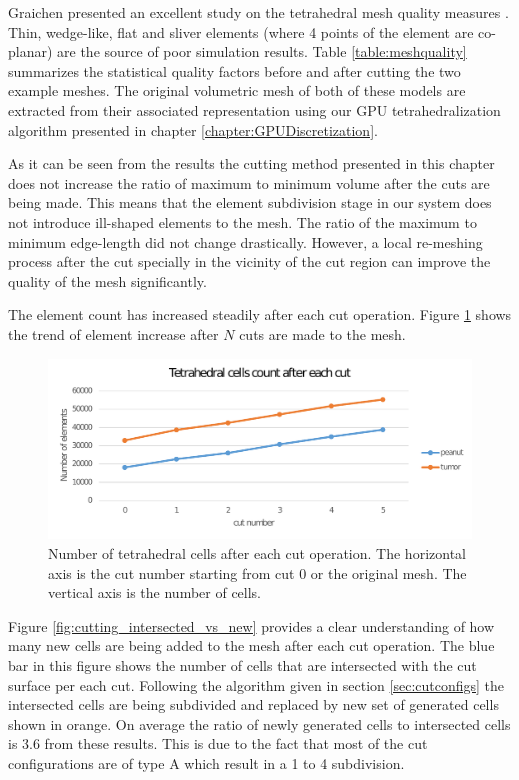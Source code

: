 Graichen \etal presented an excellent study on the tetrahedral mesh quality measures \cite{Graichen1993}. 
Thin, wedge-like, flat and sliver elements (where 4 points of the element are co-planar) are the source of poor simulation 
results. Table \ref{table:meshquality} summarizes the statistical quality factors before and after cutting the two example meshes. 
The original volumetric mesh of both of these models are extracted from their associated \blob representation using our GPU tetrahedralization
algorithm presented in chapter \ref{chapter:GPUDiscretization}.

As it can be seen from the results the cutting method presented in this chapter does not increase the ratio of maximum to minimum 
volume after the cuts are being made. This means that the element subdivision stage in our system does not 
introduce ill-shaped elements to the mesh. The ratio of the maximum to minimum edge-length did not change drastically.
However, a local re-meshing process after the cut specially in the vicinity of the cut region can improve the quality 
of the mesh significantly. 

The element count has increased steadily after each cut operation. Figure \ref{fig:cutting_cells_increase} shows the trend of element increase 
after $N$ cuts are made to the mesh.

\begin{figure}[H]
  \centering
  \includegraphics[width=1.0\linewidth]{figures/cutting/cutting_cells_increase.pdf}
  \caption{\label{fig:cutting_cells_increase}
  {Number of tetrahedral cells after each cut operation. The horizontal axis is the cut number starting from cut 0 or the original mesh. 
  The vertical axis is the number of cells.}
}
\end{figure}

Figure \ref{fig:cutting_intersected_vs_new} provides a clear understanding of how many new cells are being added to the mesh after each cut operation.
The blue bar in this figure shows the number of cells that are intersected with the cut surface per each cut. Following the algorithm given in 
section \ref{sec:cutconfigs} the intersected cells are being subdivided and replaced by new set of generated cells shown in orange. 
On average the ratio of newly generated cells to intersected cells is 3.6 from these results. This is due to the fact that most of the cut configurations
are of type A which result in a 1 to 4 subdivision. 


